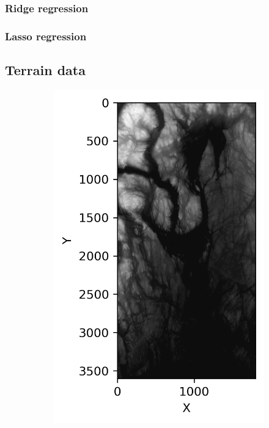 \documentclass[../main.tex]{subfiles}
\begin{document}
\subsubsection{Ridge regression}
\subsubsection{Lasso regression}

\subsection{Terrain data}
\begin{figure}[htb] 
   \centering
   \begin{subfigure}[b]{0.45\textwidth}
    \centering
    \includegraphics[width=\textwidth]{../assets/terrain_n59_e010.png} 

\end{subfigure}
\end{figure}
\end{document}

